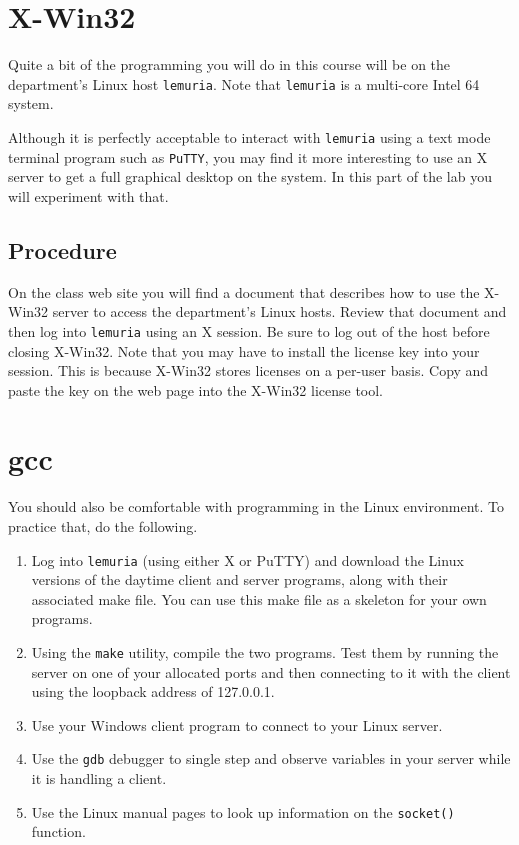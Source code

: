 \documentclass[twocolumn]{article}
\begin{document}
\section{X-Win32}

Quite a bit of the programming you will do in this course will be on the department's Linux host
\texttt{lemuria}. Note that \texttt{lemuria} is a multi-core Intel 64 system.

Although it is perfectly acceptable to interact with \texttt{lemuria} using a text mode terminal
program such as \texttt{PuTTY}, you may find it more interesting to use an X server to get a
full graphical desktop on the system. In this part of the lab you will experiment with that.

\subsection*{Procedure}

On the class web site you will find a document that describes how to use the X-Win32 server to
access the department's Linux hosts. Review that document and then log into \texttt{lemuria}
using an X session. Be sure to log out of the host before closing X-Win32. Note that you may
have to install the license key into your session. This is because X-Win32 stores licenses on a
per-user basis. Copy and paste the key on the web page into the X-Win32 license tool.

\section{gcc}

You should also be comfortable with programming in the Linux environment. To practice that, do
the following.

\begin{enumerate}

\item Log into \texttt{lemuria} (using either X or PuTTY) and download the Linux versions of the
  daytime client and server programs, along with their associated make file. You can use this
  make file as a skeleton for your own programs.

\item Using the \texttt{make} utility, compile the two programs. Test them by running the server
  on one of your allocated ports and then connecting to it with the client using the loopback
  address of 127.0.0.1.

\item Use your Windows client program to connect to your Linux server.

\item Use the \texttt{gdb} debugger to single step and observe variables in your server while it
  is handling a client.

\item Use the Linux manual pages to look up information on the \texttt{socket()} function.

\end{enumerate}
\end{document}
